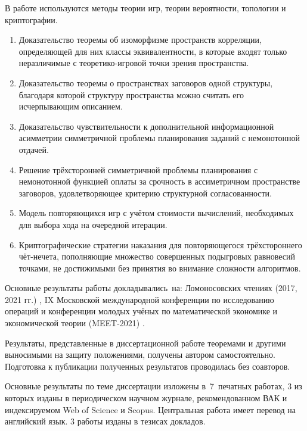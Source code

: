 {\methods} В работе используются методы теории игр, теории вероятности, топологии и криптографии.

{}
\begin{enumerate}[beginpenalty=10000] %
  \item Доказательство теоремы об изоморфизме пространств корреляции, определяющей для них классы эквивалентности, в которые входят только неразличимые с теоретико-игровой точки зрения пространства.
  \item Доказательство теоремы о пространствах заговоров одной структуры, благодаря которой структуру пространства можно считать его исчерпывающим описанием.
  \item Доказательство чувствительности к дополнительной информационной асимметрии симметричной проблемы планирования заданий с немонотонной отдачей.
  \item Решение трёхсторонней симметричной проблемы планирования с немонотонной функцией оплаты за срочность в ассиметричном пространстве заговоров, удовлетворяющее критерию структурной согласованности.
  \item Модель повторяющихся игр с учётом стоимости вычислений, необходимых для выбора хода на очередной итерации.
  \item Криптографические стратегии наказания для повторяющегося трёхстороннего чёт-нечета, пополняющие множество совершенных подыгровых равновесий точками, не достижимыми без принятия во внимание сложности алгоритмов.
\end{enumerate}


{\probation}
Основные результаты работы докладывались~на: Ломоносовских чтениях (2017, 2021 гг.) \cite{ownlmr2017, ownlmr2021}, IX Московской международной конференции по исследованию операций \cite{ownorm2018} и конференции молодых учёных по математической экономике и экономической теории (MEET-2021) \cite{meet2021}.

{\contribution} Результаты, представленные в диссертационной работе теоремами и другими выносимыми на защиту положениями, получены автором самостоятельно. Подготовка к публикации полученных результатов проводилась без соавторов.

{\publications} Основные результаты по теме диссертации изложены в~7~печатных работах, 3 из которых \cite{ownconsp}\cite{owncards}\cite{ownsched} изданы в периодическом научном журнале, рекомендованном ВАК и индексируемом Web of Science и Scopus. Центральная работа имеет перевод на английский язык\cite{ownconsp_eng}. 3 работы изданы в тезисах докладов.
